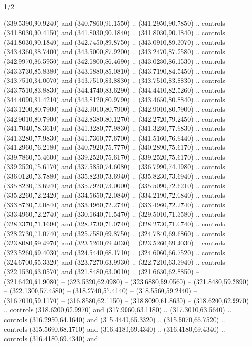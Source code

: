 \begin{flagdescription}{1/2}
\begin{scope}[xshift=0.5\flaglength]
\begin{scope}[scale=0.004\flagwidth,xshift=-90mm,yshift=89mm]
\begin{scope}[y=0.80pt, x=0.80pt, yscale=-1, xscale=1, inner sep=0pt, outer sep=0pt]
  (339.5390,90.9240) and (340.7860,91.1550) .. (341.2950,90.7850) .. controls
  (341.8030,90.4150) and (341.8030,90.1840) .. (341.8030,90.1840) .. controls
  (341.8030,90.1840) and (342.7450,89.8750) .. (343.0910,89.3070) .. controls
  (343.4360,88.7400) and (343.5000,87.9200) .. (343.2470,87.2580) .. controls
  (342.9970,86.5950) and (342.6800,86.4690) .. (343.0280,86.1530) .. controls
  (343.3730,85.8380) and (343.6880,85.0810) .. (343.7190,84.5450) .. controls
  (343.7510,84.0070) and (343.7510,83.8830) .. (343.7510,83.8830) .. controls
  (343.7510,83.8830) and (344.4740,83.6290) .. (344.4410,82.5260) .. controls
  (344.4090,81.4210) and (343.8120,80.9790) .. (343.4650,80.8840) .. controls
  (343.1200,80.7900) and (342.9010,80.7900) .. (342.9010,80.7900) .. controls
  (342.9010,80.7900) and (342.8380,80.1270) .. (342.2720,79.2450) .. controls
  (341.7040,78.3610) and (341.3280,77.9830) .. (341.3280,77.9830) .. controls
  (341.3280,77.9830) and (341.7360,77.6700) .. (341.5160,76.9440) .. controls
  (341.2960,76.2180) and (340.7920,75.7770) .. (340.2890,75.6170) .. controls
  (339.7860,75.4600) and (339.2520,75.6170) .. (339.2520,75.6170) .. controls
  (339.2520,75.6170) and (337.5850,74.6080) .. (336.7990,74.1980) .. controls
  (336.0120,73.7880) and (335.8230,73.6940) .. (335.8230,73.6940) .. controls
  (335.8230,73.6940) and (335.7920,73.0000) .. (335.5090,72.6210) .. controls
  (335.2260,72.2420) and (334.5650,72.0840) .. (334.2190,72.0840) .. controls
  (333.8730,72.0840) and (333.4960,72.2740) .. (333.4960,72.2740) .. controls
  (333.4960,72.2740) and (330.6640,71.5470) .. (329.5010,71.3580) .. controls
  (328.3370,71.1690) and (328.2730,71.0740) .. (328.2730,71.0740) .. controls
  (328.2730,71.0740) and (325.7580,69.8750) .. (324.7840,69.6860) .. controls
  (323.8080,69.4970) and (323.5260,69.4030) .. (323.5260,69.4030) .. controls
  (323.5260,69.4030) and (324.5440,68.1710) .. (324.6060,66.7520) .. controls
  (324.6700,65.3320) and (323.7270,63.9930) .. (322.7210,63.3940) .. controls
  (322.1530,63.0570) and (321.8480,63.0010) .. (321.6630,62.8850) --
  (321.6420,61.9080) -- (323.5320,62.0980) -- (323.6880,59.0560) --
  (321.8480,59.2890) -- (322.1300,57.4580) -- (318.2740,57.4140) --
  (318.5560,59.2440) -- (316.7010,59.1170) -- (316.8580,62.1150) --
  (318.8090,61.8630) -- (318.6200,62.9970) .. controls (318.6200,62.9970) and
  (317.9060,63.1180) .. (317.3010,63.5640) .. controls (316.2950,64.1640) and
  (315.4440,65.3320) .. (315.5070,66.7520) .. controls (315.5690,68.1710) and
  (316.4180,69.4340) .. (316.4180,69.4340) .. controls (316.4180,69.4340) and

\end{scope}
\end{scope}
\end{scope}
\end{flagdescription}
